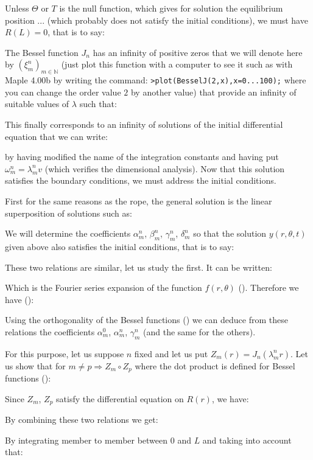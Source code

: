 	Unless $\Theta$ or $T$ is the null function, which gives for solution the equilibrium position ... (which probably does not satisfy the initial conditions), we must have $R(L)=0$, that is to say:
	
	The Bessel function $J_n$ has an infinity of positive zeros that we will denote here by $(\xi_m^n)_{m\in\mathbb{N}}$ (just plot this function with a computer to see it such as with Maple 4.00b by writing the command: \texttt{>plot(BesselJ(2,x),x=0...100);} where you can change the order value $2$ by another value) that provide an infinity of suitable values of $\lambda$ such that:
	
	This finally corresponds to an infinity of solutions of the initial differential equation that we can write:
	
	by having modified the name of the integration constants and having put $\omega_m^n=\lambda_m^n v$ (which verifies the dimensional analysis). Now that this solution satisfies the boundary conditions, we must address the initial conditions.
	
	First for the same reasons as the rope, the general solution is the linear superposition of solutions such as:
	
	We will determine the coefficients $\alpha_m^n$, $\beta_m^n$, $\gamma_m^n$, $\delta_m^n$ so that the solution $y(r,\theta,t)$ given above also satisfies the initial conditions, that is to say:
	
	These two relations are similar, let us study the first. It can be written:
	
	Which is the Fourier series expansion of the function $f(r,\theta)$ (). Therefore we have ():
	
	Using the orthogonality of the Bessel functions () we can deduce from these relations the coefficients $\alpha_m^0$, $\alpha_m^n$, $\gamma_m^n$ (and the same for the others).

	For this purpose, let us suppose $n$ fixed and let us put $Z_m(r)=J_n(\lambda_m^n r)$. Let us show that for $m\neq p\Rightarrow Z_m\circ Z_p$ where the dot product is defined for Bessel functions ():
	
	Since $Z_m$, $Z_p$ satisfy the differential equation on $R(r)$, we have:
	
	By combining these two relations we get:
	
	By integrating member to member between $0$ and $L$ and taking into account that:
	
